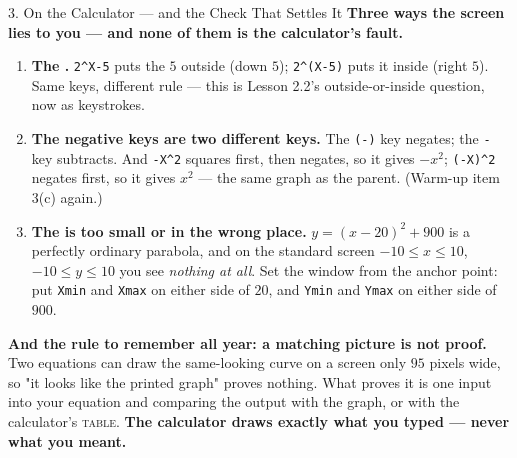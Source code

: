 \documentclass[10pt]{article}
\begin{document}
\begin{notesbox}{3. On the Calculator --- and the Check That Settles It}
\vspace{6pt}
\textbf{Three ways the screen lies to you --- and none of them is the calculator's fault.}
\begin{enumerate}[leftmargin=1.5em, itemsep=3pt, topsep=3pt]
  \item \textbf{The \blank{2.6cm}.} \texttt{2\^{}X-5} puts the $5$ outside (down $5$);
        \texttt{2\^{}(X-5)} puts it inside (right $5$). Same keys, different rule --- this is Lesson
        2.2's outside-or-inside question, now as keystrokes.
  \item \textbf{The negative keys are two different keys.} The \texttt{(-)} key negates; the
        \texttt{-} key subtracts. And \texttt{-X\^{}2} squares first, then negates, so it gives
        $-x^2$; \texttt{(-X)\^{}2} negates first, so it gives $x^2$ --- the same graph as the
        parent. (Warm-up item 3(c) again.)
  \item \textbf{The \blank{2.6cm} is too small or in the wrong place.} $y=(x-20)^2+900$ is a
        perfectly ordinary parabola, and on the standard screen $-10 \le x \le 10$,
        $-10 \le y \le 10$ you see \emph{nothing at all}. Set the window from the anchor point: put
        \texttt{Xmin} and \texttt{Xmax} on either side of $20$, and \texttt{Ymin} and \texttt{Ymax}
        on either side of $900$.
\end{enumerate}

\vspace{4pt}
\textbf{And the rule to remember all year: a matching picture is not proof.} Two equations can draw
the same-looking curve on a screen only $95$ pixels wide, so "it looks like the printed graph"
proves nothing. What proves it is \blank{2.8cm} one input into your equation and comparing the
output with the graph, or with the calculator's \textsc{table}. \textbf{The calculator draws exactly
what you typed --- never what you meant.}
\end{notesbox}

\vspace{0.10in}
\end{document}
